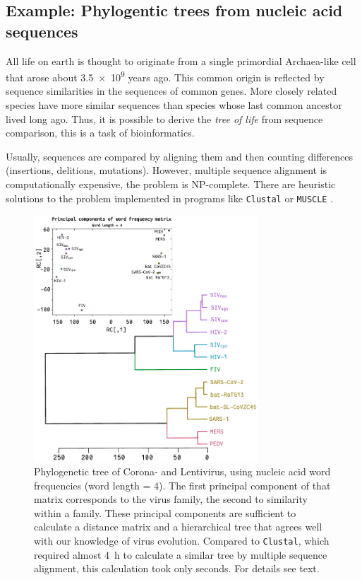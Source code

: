 \begin{refsection}
\section{Example: Phylogentic trees from nucleic acid sequences}

All life on earth is thought to originate from a single primordial Archaea-like cell that arose about \num{3.5e9} years ago. This common origin is reflected by sequence similarities in the sequences of common genes. More closely related species have more similar sequences than species whose last common ancestor lived long ago. Thus, it is possible to derive the \emph{tree of life} from sequence comparison, this is a task of bioinformatics.

Usually, sequences are compared by aligning them and then counting differences (insertions, delitions, mutations). However, multiple sequence alignment is computationally expensive, the problem is NP-complete. There are heuristic solutions to the problem implemented in programs like \texttt{Clustal} \parencite{Lar-07} or \texttt{MUSCLE} \parencite{Edg-04}.

\begin{figure}
 \caption{\capstart Phylogenetic tree of Corona- and Lentivirus, using nucleic acid word frequencies (word length = \num{4}). The first principal component of that matrix corresponds to the virus family, the second to similarity within a family. These principal components are sufficient to calculate a distance matrix and a hierarchical tree that agrees well with our knowledge of virus evolution. Compared to \texttt{Clustal}, which required almost \SI{4}{h} to calculate a similar tree by multiple sequence alignment, this calculation took only seconds. For details see text.}
   \label{fig:PincComp}
   \centering
     \includegraphics[width=0.75\textwidth]{Graphics/PrincComp}
\end{figure}


\end{refsection}

